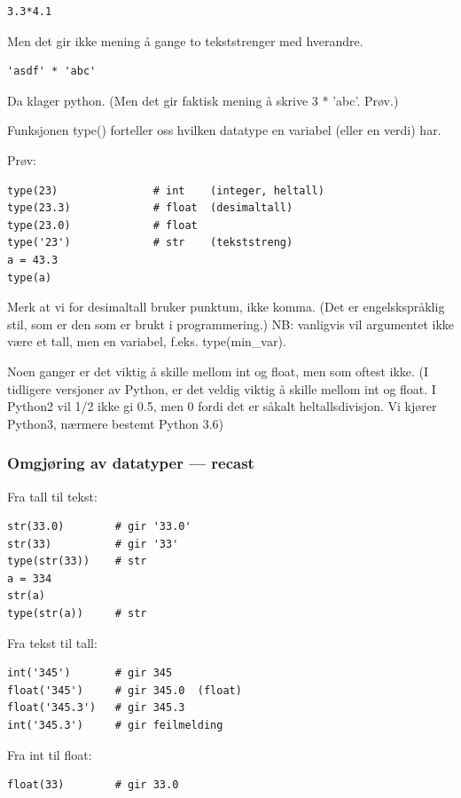 {\begin{lstlisting}
3.3*4.1
\end{lstlisting}

Men det gir ikke mening å gange to tekststrenger med hverandre.

\begin{lstlisting}
'asdf' * 'abc'
\end{lstlisting}

Da klager python. (Men det gir faktisk mening å skrive 3 * 'abc'. Prøv.) 

Funksjonen type() forteller oss hvilken datatype en variabel (eller en verdi) har. 

Prøv: 
\begin{lstlisting}
type(23)               # int    (integer, heltall) 
type(23.3)             # float  (desimaltall) 
type(23.0)             # float  
type('23')             # str    (tekststreng) 
a = 43.3
type(a)
\end{lstlisting}

Merk at vi for desimaltall bruker punktum, ikke komma. (Det er engelskspråklig stil, som er den som er brukt i programmering.) NB: vanligvis vil argumentet ikke være et tall, men en variabel, f.eks. type(min\_{}var).

Noen ganger er det viktig å skille mellom int og float, men som oftest ikke. (I tidligere versjoner av Python, er det veldig viktig å skille mellom int og float. I Python2 vil 1/2 ikke gi 0.5, men 0 fordi det er såkalt heltallsdivisjon.  Vi kjører Python3, nærmere bestemt Python 3.6)

\subsubsection{Omgjøring av datatyper --- recast}

Fra tall til tekst: 

\begin{lstlisting}
str(33.0)        # gir '33.0'
str(33)          # gir '33'
type(str(33))    # str
a = 334
str(a)
type(str(a))     # str
\end{lstlisting}

Fra tekst til tall:

\begin{lstlisting} 
int('345')       # gir 345
float('345')     # gir 345.0  (float) 
float('345.3')   # gir 345.3 
int('345.3')     # gir feilmelding
\end{lstlisting}

Fra int til float: 
\begin{lstlisting}
float(33)        # gir 33.0
\end{lstlisting}

}

